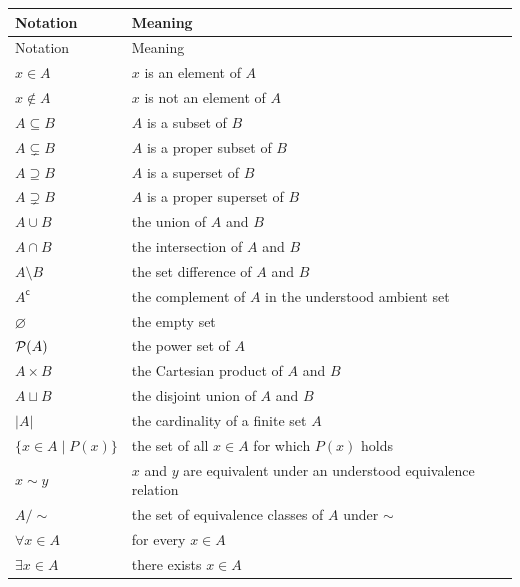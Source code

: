    \vspace{0.5em}

    {\small
    \renewcommand{\arraystretch}{1.18}
    \begin{longtable}{@{}L{0.27\textwidth}L{0.65\textwidth}@{}}
        \toprule
        Notation & Meaning \\
        \midrule
        \endfirsthead

        \toprule
        Notation & Meaning \\
        \midrule
        \endhead

        \bottomrule
        \endlastfoot

        $x\in A$ & $x$ is an element of $A$ \\
        $x\notin A$ & $x$ is not an element of $A$ \\
        $A\subseteq B$ & $A$ is a subset of $B$ \\
        $A\subsetneq B$ & $A$ is a proper subset of $B$ \\
        $A\supseteq B$ & $A$ is a superset of $B$ \\
        $A\supsetneq B$ & $A$ is a proper superset of $B$ \\
        $A\cup B$ & the union of $A$ and $B$ \\
        $A\cap B$ & the intersection of $A$ and $B$ \\
        $A\setminus B$ & the set difference of $A$ and $B$ \\
        $A^{\mathsf c}$ & the complement of $A$ in the understood ambient set \\
        $\varnothing$ & the empty set \\
        $\mathcal{P}(A)$ & the power set of $A$ \\
        $A\times B$ & the Cartesian product of $A$ and $B$ \\
        $A\sqcup B$ & the disjoint union of $A$ and $B$ \\
        $|A|$ & the cardinality of a finite set $A$ \\
        $\{x\in A\mid P(x)\}$ & the set of all $x\in A$ for which $P(x)$ holds \\
        $x\sim y$ & $x$ and $y$ are equivalent under an understood equivalence relation \\
        $A/\sim$ & the set of equivalence classes of $A$ under $\sim$ \\
        $\forall x\in A$ & for every $x\in A$ \\
        $\exists x\in A$ & there exists $x\in A$ \\

\end{longtable}}
